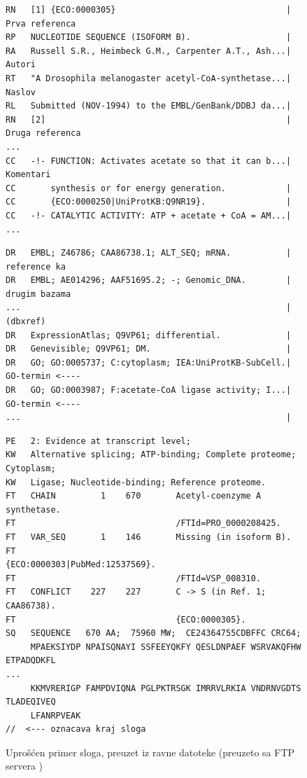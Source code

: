 \begin{figure}[h!]
\begin{lstlisting}[firstnumber=7,   basicstyle=\fontsize{8}{10}\selectfont\ttfamily\color{gray}]
RN   [1] {ECO:0000305}                                  | Prva referenca
RP   NUCLEOTIDE SEQUENCE (ISOFORM B).                   | 
RA   Russell S.R., Heimbeck G.M., Carpenter A.T., Ash...| Autori
RT   "A Drosophila melanogaster acetyl-CoA-synthetase...| Naslov
RL   Submitted (NOV-1994) to the EMBL/GenBank/DDBJ da...|
RN   [2]                                                | Druga referenca              
...                                                     
CC   -!- FUNCTION: Activates acetate so that it can b...| Komentari
CC       synthesis or for energy generation.            |
CC       {ECO:0000250|UniProtKB:Q9NR19}.                |
CC   -!- CATALYTIC ACTIVITY: ATP + acetate + CoA = AM...|
...                                                     
\end{lstlisting}
\begin{lstlisting}[firstnumber=30]
DR   EMBL; Z46786; CAA86738.1; ALT_SEQ; mRNA.           | reference ka
DR   EMBL; AE014296; AAF51695.2; -; Genomic_DNA.        | drugim bazama 
...                                                     | (dbxref)
DR   ExpressionAtlas; Q9VP61; differential.             |
DR   Genevisible; Q9VP61; DM.                           |
DR   GO; GO:0005737; C:cytoplasm; IEA:UniProtKB-SubCell.| GO-termin <----
DR   GO; GO:0003987; F:acetate-CoA ligase activity; I...| GO-termin <----
...                                                     |
\end{lstlisting}
\begin{lstlisting}[firstnumber=38]
PE   2: Evidence at transcript level;
KW   Alternative splicing; ATP-binding; Complete proteome; Cytoplasm; 
KW   Ligase; Nucleotide-binding; Reference proteome.                  
FT   CHAIN         1    670       Acetyl-coenzyme A synthetase.
FT                                /FTId=PRO_0000208425.
FT   VAR_SEQ       1    146       Missing (in isoform B).
FT                                {ECO:0000303|PubMed:12537569}.
FT                                /FTId=VSP_008310.
FT   CONFLICT    227    227       C -> S (in Ref. 1; CAA86738).
FT                                {ECO:0000305}.
SQ   SEQUENCE   670 AA;  75960 MW;  CE24364755CDBFFC CRC64;
     MPAEKSIYDP NPAISQNAYI SSFEEYQKFY QESLDNPAEF WSRVAKQFHW ETPADQDKFL
...
     KKMVRERIGP FAMPDVIQNA PGLPKTRSGK IMRRVLRKIA VNDRNVGDTS TLADEQIVEQ
     LFANRPVEAK
//  <--- oznacava kraj sloga
\end{lstlisting}
\caption{Uprošćen primer sloga, preuzet iz ravne datoteke  \footnotesize (preuzeto sa FTP servera \cite{sprot})  }
\label{fig:slog}
\end{figure}


